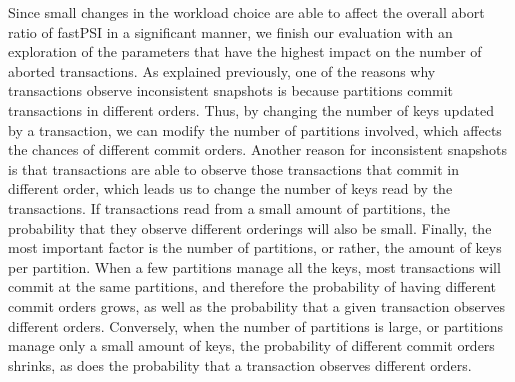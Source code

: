 Since small changes in the workload choice are able to affect the overall abort ratio of fastPSI in a significant manner, we finish our evaluation with an exploration of the parameters that have the highest impact on the number of aborted transactions. As explained previously, one of the reasons why transactions observe inconsistent snapshots is because partitions commit transactions in different orders. Thus, by changing the number of keys updated by a transaction, we can modify the number of partitions involved, which affects the chances of different commit orders. Another reason for inconsistent snapshots is that transactions are able to observe those transactions that commit in different order, which leads us to change the number of keys read by the transactions. If transactions read from a small amount of partitions, the probability that they observe different orderings will also be small. Finally, the most important factor is the number of partitions, or rather, the amount of keys per partition. When a few partitions manage all the keys, most transactions will commit at the same partitions, and therefore the probability of having different commit orders grows, as well as the probability that a given transaction observes different orders. Conversely, when the number of partitions is large, or partitions manage only a small amount of keys, the probability of different commit orders shrinks, as does the probability that a transaction observes different orders.

